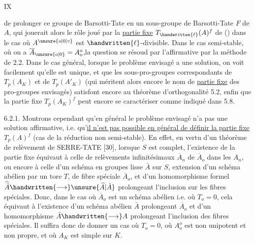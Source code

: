 \hfill IX

de prolonger ce groupe de Barsotti-Tate en un sous-groupe de Barsotti-Tate $F$ de $A$, qui jouerait alors le rôle joué par la \uline{partie fixe} $T_{\handwritten{\ell}}(A)^f$ de () dans le cas où $A^{\unsure{o|0|\circ}}$ est $\handwritten{\ell}$-divisible. Dans le cas semi-stable, où on a $\overline A_{\unsure{o|0}}=A_o^o$,la question se résoud par l'affirmative par la méthode de 2.2. Dans le cas général, lorsque le problème envisagé a une solution, on voit facilement qu'elle est unique, et que les sous-pro-groupes correspondants de $T_p(A_K)$ et de $T_p(A'_K)$ (qui méritent alors encore le nom de \uline{partie fixe} des pro-groupes envisagés) satisfont encore au théorème d'orthogonalité 5.2, enfin que la partie fixe $T_p(A_K)^f$ peut encore se caractériser comme indiqué dans 5.8.

6.2.1. Montrons cependant qu'en général le problème envisagé n'a pas une solution affirmative, i.e. qu'\uline{il n'est pas possible en général de définir la partie fixe} $T_p(A)^f$ (cas de la réduction non semi-stable). En effet, en vertu d'un théorème de relèvement de SERRE-TATE [30], lorsque $S$ est complet, l'existence de la partie fixe équivaut à celle de relèvements infinitésimaux $\overline A_n$ de $\overline A_o$ dans les $A_n$, ou encore à celle d'un schéma en groupes lisse $\bar A$ sur $S$, extension d'un schéma abélien par un tore $T$, de fibre spéciale $\overline A_o$, et d'un homomorphisme formel $\widehat{\bar A}\handwritten{\longrightarrow}\unsure{\widehat A|\dot A}$ prolongeant l'inclusion sur les fibres spéciales. Donc, dans le cas où $\overline A_o$ est un schéma abélien i.e. où $T_o=0$, cela équivaut à l'existence d'un schéma abélien $\bar A$ prolongeant $\overline A_o$ et d'un homomorphisme $\bar A\handwritten{\longrightarrow} A$ prolongeant l'inclusion des fibres spéciales. Il suffira donc de donner un cas où $T_o=0$, où $A_o^o$ est non unipotent et non propre, et où $A_K$ est simple sur $K$.

